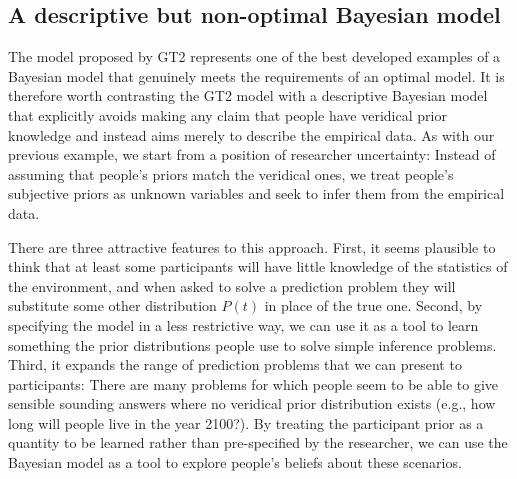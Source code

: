 \documentclass[doc,floatsintext]{apa6}
\begin{document}
\subsection*{A descriptive but non-optimal Bayesian model}

The model proposed by GT2 represents one of the best developed examples of a Bayesian model that genuinely meets the requirements of an optimal model. It is therefore worth contrasting the GT2 model with a descriptive Bayesian model that explicitly avoids making any claim that people have veridical prior knowledge and instead aims merely to describe the empirical data. As with our previous example, we start from a position of researcher uncertainty: Instead of assuming that people's priors match the veridical ones, we treat people's subjective priors as unknown variables and seek to infer them from the empirical data.

There are three attractive features to this approach. First, it seems plausible to think that at least some participants will have little knowledge of the statistics of the environment, and when asked to solve a prediction problem they will substitute some other distribution $P(t)$ in place of the true one. Second, by specifying the model in a less restrictive way, we can use it as a tool to learn something the prior distributions people use to solve simple inference problems.  Third, it expands the range of prediction problems that we can present to participants: There are many problems for which people seem to be able to give sensible sounding answers where no veridical prior distribution exists (e.g., how long will people live in the year 2100?). By treating the participant prior as a quantity to be learned rather than pre-specified by the researcher, we can use the Bayesian model as a tool to explore people's beliefs about these scenarios.
\end{document}

